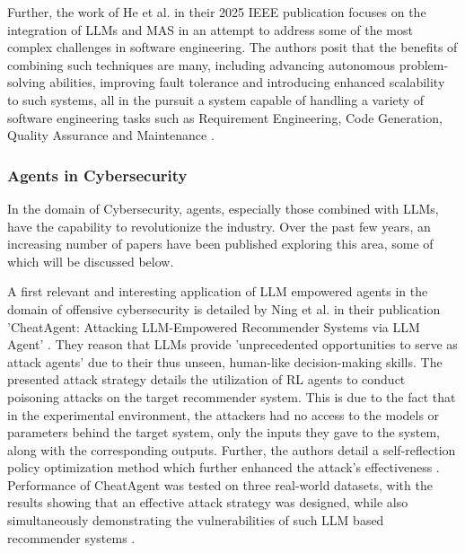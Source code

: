 \documentclass[a4paper,9pt]{scrartcl}
\begin{document}
Further, the work of He et al. in their 2025 IEEE publication
\cite{heLLMBasedMultiAgentSystems2025} focuses on the integration of LLMs and MAS in an attempt
to address some of the most complex challenges in software engineering. The authors posit that 
the benefits of combining such techniques are many, including advancing autonomous problem-solving
abilities, improving fault tolerance and introducing enhanced scalability to such systems, all 
in the pursuit a system capable of handling a variety of software engineering tasks such as 
Requirement Engineering, Code Generation, Quality Assurance and Maintenance \cite{heLLMBasedMultiAgentSystems2025}.


\subsubsection{Agents in Cybersecurity}

In the domain of Cybersecurity, agents, especially those combined with LLMs, have
the capability to revolutionize the industry. Over the past few years, an 
increasing number of papers have been published exploring this area, some of which
will be discussed below.


A first relevant and interesting application of LLM empowered agents in the domain of 
offensive cybersecurity is detailed by Ning et al. in their publication 'CheatAgent: 
Attacking LLM-Empowered Recommender Systems via LLM Agent' 
\cite{ningCheatAgentAttackingLLMEmpowered2024}. They reason that LLMs provide
'unprecedented opportunities to serve as attack agents' 
\cite{ningCheatAgentAttackingLLMEmpowered2024} due to their thus unseen, human-like 
decision-making skills. The presented attack strategy details the utilization of RL
agents to conduct poisoning attacks on the target recommender system. This is due 
to the fact that in the experimental environment, the attackers had no access to the
models or parameters behind the target system, only the inputs they gave to the system,
along with the corresponding outputs. Further, the authors detail a self-reflection 
policy optimization method which further enhanced the attack's effectiveness 
\cite{ningCheatAgentAttackingLLMEmpowered2024}. Performance of CheatAgent was tested on three 
real-world datasets, with the results showing that an effective attack strategy was designed, 
while also simultaneously demonstrating the vulnerabilities of such LLM based recommender 
systems \cite{ningCheatAgentAttackingLLMEmpowered2024}.
\end{document}
